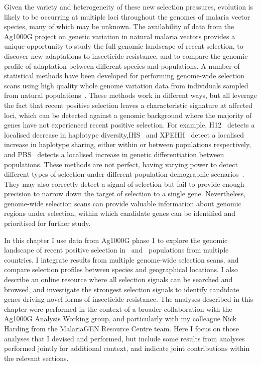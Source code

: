\documentclass[a4paper,11pt,abstracton,hidelinks]{scrartcl}
\begin{document}
Given the variety and heterogeneity of these new selection pressures, evolution is likely to be occurring at multiple loci throughout the genomes of malaria vector species, many of which may be unknown.
%
The availability of data from the Ag1000G project on genetic variation in natural malaria vectors provides a unique opportunity to study the full genomic landscape of recent selection, to discover new adaptations to insecticide resistance, and to compare the genomic profile of adaptation between different species and populations.
%
A number of statistical methods have been developed for performing genome-wide selection scans using high quality whole genome variation data from individuals sampled from natural populations~\parencite{Oleksyk2010,Haasl2015,Vatsiou2016,Pavlidis2017,Booker2017}.
%
These methods work in different ways, but all leverage the fact that recent positive selection leaves a characteristic signature at affected loci, which can be detected against a genomic background where the majority of genes have not experienced recent positive selection.
%
For example, H12~\parencite{Garud2015} detects a localised decrease in haplotype diversity,IHS~\parencite{Voight2006} and XPEHH~\parencite{Sabeti2007} detect a localised increase in haplotype sharing, either within or between populations respectively, and PBS~\parencite{Yi2010,Crawford2017} detects a localised increase in genetic differentiation between populations.
%
These methods are not perfect, having varying power to detect different types of selection under different population demographic scenarios~\parencite{Haasl2015,Vatsiou2016,Pavlidis2017,Booker2017}.
%
They may also correctly detect a signal of selection but fail to provide enough precision to narrow down the target of selection to a single gene.
%
Nevertheless, genome-wide selection scans can provide valuable information about genomic regions under selection, within which candidate genes can be identified and prioritised for further study.


In this chapter I use data from Ag1000G phase 1 to explore the genomic landscape of recent positive selection in \agam\ and \acol\ populations from multiple countries.
%
I integrate results from multiple genome-wide selection scans, and compare selection profiles between species and geographical locations.
%
I also describe an online resource where all selection signals can be searched and browsed, and investigate the strongest selection signals to identify candidate genes driving novel forms of insecticide resistance.
%
The analyses described in this chapter were performed in the context of a broader collaboration with the Ag1000G Analysis Working group, and particularly with my colleague Nick Harding from the MalariaGEN Resource Centre team.
%
Here I focus on those analyses that I devised and performed, but include some results from analyses performed jointly for additional context, and indicate joint contributions within the relevant sections.
%
\end{document}
